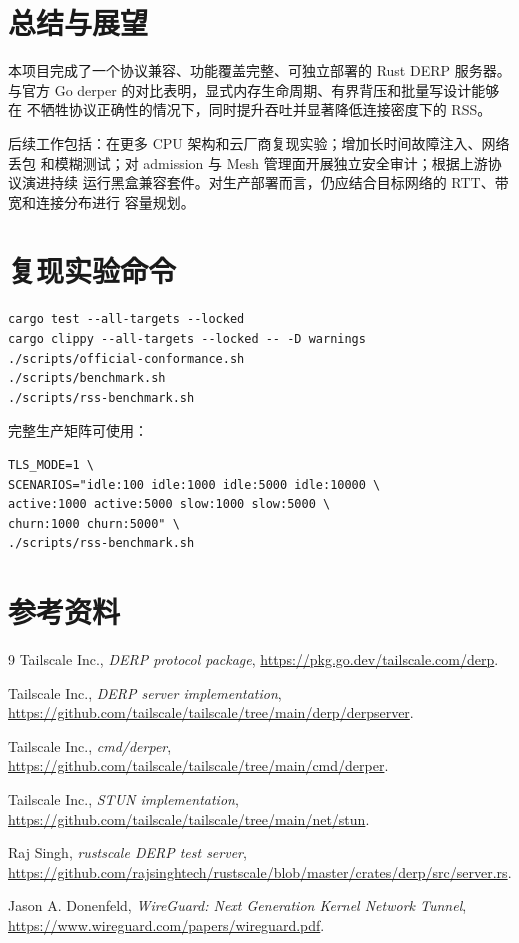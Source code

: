 \documentclass[UTF8,a4paper,zihao=-4]{ctexart}
\begin{document}
\section{总结与展望}

本项目完成了一个协议兼容、功能覆盖完整、可独立部署的 Rust DERP 服务器。
与官方 Go derper 的对比表明，显式内存生命周期、有界背压和批量写设计能够在
不牺牲协议正确性的情况下，同时提升吞吐并显著降低连接密度下的 RSS。

后续工作包括：在更多 CPU 架构和云厂商复现实验；增加长时间故障注入、网络丢包
和模糊测试；对 admission 与 Mesh 管理面开展独立安全审计；根据上游协议演进持续
运行黑盒兼容套件。对生产部署而言，仍应结合目标网络的 RTT、带宽和连接分布进行
容量规划。

\clearpage
\appendix
\section{复现实验命令}

\begin{verbatim}
cargo test --all-targets --locked
cargo clippy --all-targets --locked -- -D warnings
./scripts/official-conformance.sh
./scripts/benchmark.sh
./scripts/rss-benchmark.sh
\end{verbatim}

完整生产矩阵可使用：

\begin{verbatim}
TLS_MODE=1 \
SCENARIOS="idle:100 idle:1000 idle:5000 idle:10000 \
active:1000 active:5000 slow:1000 slow:5000 \
churn:1000 churn:5000" \
./scripts/rss-benchmark.sh
\end{verbatim}

\section{参考资料}

\begin{thebibliography}{9}
Tailscale Inc.,
\textit{DERP protocol package},
\url{https://pkg.go.dev/tailscale.com/derp}.

Tailscale Inc.,
\textit{DERP server implementation},
\url{https://github.com/tailscale/tailscale/tree/main/derp/derpserver}.

Tailscale Inc.,
\textit{cmd/derper},
\url{https://github.com/tailscale/tailscale/tree/main/cmd/derper}.

Tailscale Inc.,
\textit{STUN implementation},
\url{https://github.com/tailscale/tailscale/tree/main/net/stun}.

Raj Singh,
\textit{rustscale DERP test server},
\url{https://github.com/rajsinghtech/rustscale/blob/master/crates/derp/src/server.rs}.

Jason A. Donenfeld,
\textit{WireGuard: Next Generation Kernel Network Tunnel},
\url{https://www.wireguard.com/papers/wireguard.pdf}.
\end{thebibliography}
\end{document}
